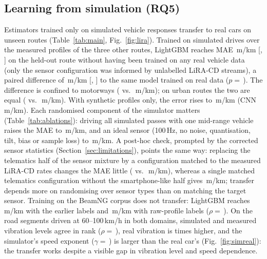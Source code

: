 \subsection{Learning from simulation (RQ5)}
\label{sec:res_sim}
Estimators trained only on simulated vehicle responses transfer to real cars on unseen routes (Table~\ref{tab:main}, Fig.~\ref{fig:lira}).
Trained on simulated drives over the measured profiles of the three other routes, LightGBM reaches MAE \zsPsevenGbmMae\,m/km [\zsPsevenGbmMaeLo, \zsPsevenGbmMaeHi] on the held-out route without having been trained on any real vehicle data (only the sensor configuration was informed by unlabelled LiRA-CD streams), a paired difference of \zsPsevenGbmDmae\,m/km [\zsPsevenGbmDmaeLo, \zsPsevenGbmDmaeHi] to the same model trained on real data ($p=$\,\zsPsevenGbmP).
The difference is confined to motorways (\zsPsevenGbmMaeMotorway{} vs.\ \liraGbmMaeMotorway\,m/km); on urban routes the two are equal (\zsPsevenGbmMaeUrban{} vs.\ \liraGbmMaeUrban\,m/km).
With synthetic profiles only, the error rises to \zsIsoGbmMae\,m/km (CNN \zsIsoCnnMae\,m/km).
Each randomised component of the simulator matters (Table~\ref{tab:ablations}): driving all simulated passes with one mid-range vehicle raises the MAE to \zsFixVehGbmMae\,m/km, and an ideal sensor (100\,Hz, no noise, quantisation, tilt, bias or sample loss) to \zsIdealGbmMae\,m/km.
A post-hoc check, prompted by the corrected sensor statistics (Section~\ref{sec:limitations}), points the same way: replacing the telematics half of the sensor mixture by a configuration matched to the measured LiRA-CD rates changes the MAE little (\phMixGbmMae{} vs.\ \phPrimGbmMae\,m/km), whereas a single matched telematics configuration without the smartphone-like half gives \phMeasGbmMae\,m/km; transfer depends more on randomising over sensor types than on matching the target sensor.
Training on the BeamNG corpus does not transfer: LightGBM reaches \zsBngCorrGbmMae\,m/km with the earlier labels and \zsBngRawGbmMae\,m/km with raw-profile labels ($\rho=$\,\zsBngRawGbmRho).
On the \gapN{} road segments driven at 60--100\,km/h in both domains, simulated and measured vibration levels agree in rank ($\rho=$\,\gapRho), real vibration is \gapRatio{} times higher, and the simulator's speed exponent ($\gamma=$\,\gammaSim) is larger than the real car's (Fig.~\ref{fig:simreal}): the transfer works despite a visible gap in vibration level and speed dependence.

